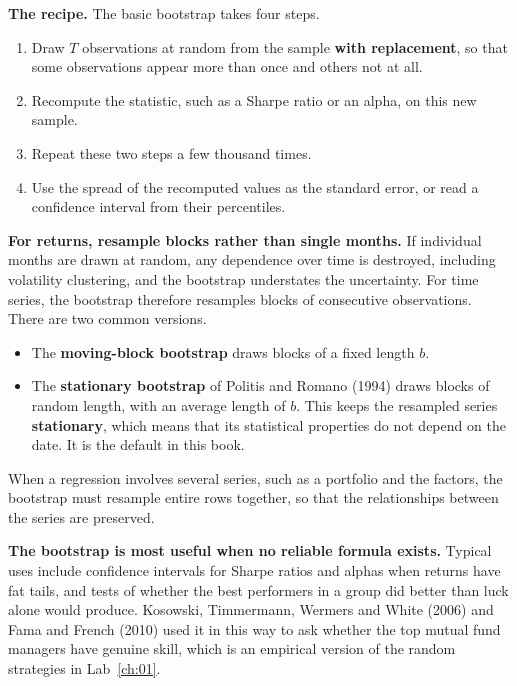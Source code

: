 \textbf{The recipe.} The basic bootstrap takes four steps.

\begin{enumerate}
  \item Draw $T$ observations at random from the sample \textbf{with replacement}, so that some observations appear more than once and others not at all.
  \item Recompute the statistic, such as a Sharpe ratio or an alpha, on this new sample.
  \item Repeat these two steps a few thousand times.
  \item Use the spread of the recomputed values as the standard error, or read a confidence interval from their percentiles.
\end{enumerate}

\textbf{For returns, resample blocks rather than single months.} If individual months are drawn at random, any dependence over time is destroyed, including volatility clustering, and the bootstrap understates the uncertainty. For time series, the bootstrap therefore resamples blocks of consecutive observations. There are two common versions.

\begin{itemize}
  \item The \textbf{moving-block bootstrap} draws blocks of a fixed length $b$.
  \item The \textbf{stationary bootstrap} of Politis and Romano (1994) draws blocks of random length, with an average length of $b$. This keeps the resampled series \textbf{stationary}, which means that its statistical properties do not depend on the date. It is the default in this book.
\end{itemize}

When a regression involves several series, such as a portfolio and the factors, the bootstrap must resample entire rows together, so that the relationships between the series are preserved.

\textbf{The bootstrap is most useful when no reliable formula exists.} Typical uses include confidence intervals for Sharpe ratios and alphas when returns have fat tails, and tests of whether the best performers in a group did better than luck alone would produce. Kosowski, Timmermann, Wermers and White (2006) and Fama and French (2010) used it in this way to ask whether the top mutual fund managers have genuine skill, which is an empirical version of the random strategies in Lab~\ref{ch:01}.

